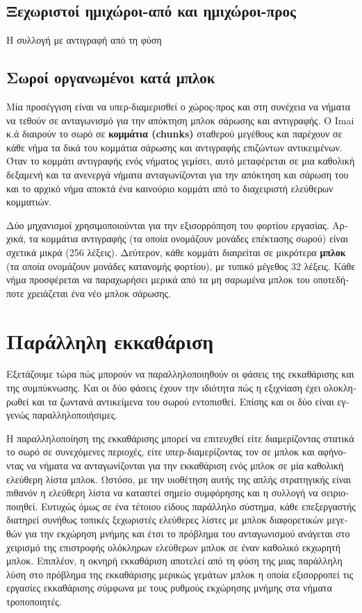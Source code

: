 \begin{greek}
 \subsection{Ξεχωριστοί ημιχώροι-από και ημιχώροι-προς}
 Η συλλογή με αντιγραφή από τη φύση
 \subsection{Σωροί οργανωμένοι κατά μπλοκ}
 Μία προσέγγιση είναι να υπερ-διαμερισθεί ο χώρος-προς και στη
 συνέχεια να νήματα να τεθούν σε ανταγωνισμό για την απόκτηση
 μπλοκ σάρωσης και αντιγραφής. Ο Imai κ.ά \cite{DBLP:journals/tpds/ImaiT93}
 διαιρούν το σωρό σε \textbf{κομμάτια (chunks)} σταθερού μεγέθους
 και παρέχουν σε κάθε νήμα τα δικά του κομμάτια σάρωσης
 και αντιγραφής επιζώντων αντικειμένων. Όταν το κομμάτι αντιγραφής
 ενός νήματος γεμίσει, αυτό μεταφέρεται σε μια καθολική δεξαμενή
 και τα ανενεργά νήματα ανταγωνίζονται για την απόκτηση και
 σάρωση του και το αρχικό νήμα αποκτά ένα καινούριο κομμάτι
 από το διαχειριστή ελεύθερων κομματιών.

 Δύο μηχανισμοί χρησιμοποιούνται για την εξισορρόπηση του φορτίου
 εργασίας. Αρχικά, τα κομμάτια αντιγραφής (τα οποία ονομάζουν
 μονάδες επέκτασης σωρού) είναι σχετικά μικρά (256 λέξεις). Δεύτερον,
 κάθε κομμάτι διαιρείται σε μικρότερα \textbf{μπλοκ} (τα οποία
 ονομάζουν μονάδες κατανομής φορτίου), με τυπικό μέγεθος 32 λέξεις.
 Κάθε νήμα προσφέρεται να παραχωρήσει μερικά από τα μη σαρωμένα
 μπλοκ του οποτεδήποτε χρειάζεται ένα νέο μπλοκ σάρωσης.  
 
 \section{Παράλληλη εκκαθάριση}
 Eξετάζουμε τώρα πώς μπορούν να παραλληλοποιηθούν οι φάσεις
 της εκκαθάρισης και της συμπύκνωσης. Και οι δύο φάσεις έχουν την
 ιδιότητα πώς η εξιχνίαση έχει ολοκληρωθεί και τα ζωντανά αντικείμενα
 του σωρού εντοπισθεί. Επίσης και οι δύο είναι εγγενώς παραλληλοποιήσιμες.

 Η παραλληλοποίηση της εκκαθάρισης μπορεί να επιτευχθεί είτε διαμερίζοντας
 στατικά το σωρό σε συνεχόμενες περιοχές, είτε υπερ-διαμερίζοντας
 τον σε μπλοκ και αφήνοντας να νήματα να ανταγωνίζονται για την
 εκκαθάριση ενός μπλοκ σε μία καθολική ελεύθερη λίστα μπλοκ. Ωστόσο,
 με την υιοθέτηση αυτής της απλής στρατηγικής είναι πιθανόν η ελεύθερη
 λίστα να καταστεί σημείο συμφόρησης και η συλλογή να σειριοποιηθεί.
 Ευτυχώς όμως σε ένα τέτοιου είδους παράλληλο σύστημα, κάθε επεξεργαστής
 διατηρεί συνήθως τοπικές ξεχωριστές ελεύθερες λίστες με μπλοκ
 διαφορετικών μεγεθών για την εκχώρηση μνήμης και έτσι το πρόβλημα
 του ανταγωνισμού ανάγεται στο χειρισμό της επιστροφής ολόκληρων
 ελεύθερων μπλοκ σε έναν καθολικό εκχωρητή μπλοκ. Επιπλέον, η
 οκνηρή εκκαθάριση αποτελεί από τη φύση της μιας παράλληλη λύση
 στο πρόβλημα της εκκαθάρισης μερικώς γεμάτων μπλοκ η οποία εξισορροπεί
 τις εργασίες εκκαθάρισης σύμφωνα με τους ρυθμούς εκχώρησης μνήμης
 στα νήματα τροποποιητές.


\end{greek}
